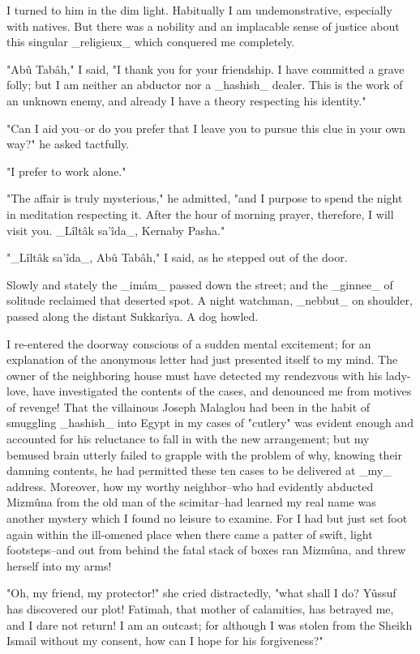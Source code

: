 I turned to him in the dim light. Habitually I am undemonstrative,
especially with natives. But there was a nobility and an implacable
sense of justice about this singular _religieux_ which conquered me
completely.

"Abû Tabâh," I said, "I thank you for your friendship. I have
committed a grave folly; but I am neither an abductor nor a _hashish_
dealer. This is the work of an unknown enemy, and already I have a
theory respecting his identity."

"Can I aid you--or do you prefer that I leave you to pursue this clue
in your own way?" he asked tactfully.

"I prefer to work alone."

"The affair is truly mysterious," he admitted, "and I purpose to
spend the night in meditation respecting it. After the hour of morning
prayer, therefore, I will visit you. _Lîltâk sa'îda_, Kernaby Pasha."

"_Lîltâk sa'îda_, Abû Tabâh," I said, as he stepped out of the door.

Slowly and stately the _imám_ passed down the street; and the _ginnee_
of solitude reclaimed that deserted spot. A night watchman, _nebbut_
on shoulder, passed along the distant Sukkarîya. A dog howled.

I re-entered the doorway conscious of a sudden mental excitement; for
an explanation of the anonymous letter had just presented itself to
my mind. The owner of the neighboring house must have detected my
rendezvous with his lady-love, have investigated the contents of the
cases, and denounced me from motives of revenge! That the villainous
Joseph Malaglou had been in the habit of smuggling _hashish_ into
Egypt in my cases of "cutlery" was evident enough and accounted for
his reluctance to fall in with the new arrangement; but my bemused
brain utterly failed to grapple with the problem of why, knowing their
damning contents, he had permitted these ten cases to be delivered
at _my_ address. Moreover, how my worthy neighbor--who had evidently
abducted Mizmûna from the old man of the scimitar--had learned my
real name was another mystery which I found no leisure to examine.
For I had but just set foot again within the ill-omened place when
there came a patter of swift, light footsteps--and out from behind
the fatal stack of boxes ran Mizmûna, and threw herself into my arms!

"Oh, my friend, my protector!" she cried distractedly, "what shall I
do? Yûssuf has discovered our plot! Fatimah, that mother of
calamities, has betrayed me, and I dare not return! I am an outcast;
for although I was stolen from the Sheikh Ismail without my consent,
how can I hope for his forgiveness?"

